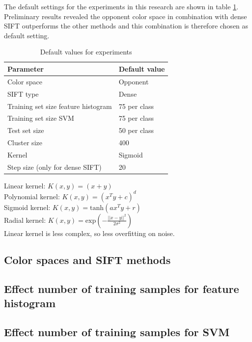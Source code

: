 The default settings for the experiments in this research are shown in table \ref{tab:default}. Preliminary results revealed the opponent color space in combination with dense SIFT outperforms the other methods and this combination is therefore chosen as default setting.

\begin{table}[H]
\begin{tabular}{|l|l|}
\hline
\textbf{Parameter} & \textbf{Default value}\\
\hline
Color space & Opponent\\
SIFT type & Dense\\
Training set size feature histogram & 75 per class\\
Training set size SVM & 75 per class\\
Test set size & 50 per class \\
Cluster size & 400 \\
Kernel & Sigmoid \\
Step size (only for dense SIFT) & 20\\
\hline
\end{tabular}
\caption{Default values for experiments}
\label{tab:default}
\end{table}
Linear kernel: $K(x,y) = (x+y)$\\
Polynomial kernel: $K(x,y) = (x^Ty + c)^d$\\
Sigmoid kernel: $K(x,y) = \text{tanh}(ax^Ty + r)$\\
Radial kernel: $K(x,y) = \text{exp}(-\frac{||x-y||^2}{2\sigma^2})$\\

Linear kernel is less complex, so less overfitting on noise. 

\subsection{Color spaces and SIFT methods}


\subsection{Effect number of training samples for feature histogram}


\subsection{Effect number of training samples for SVM}




